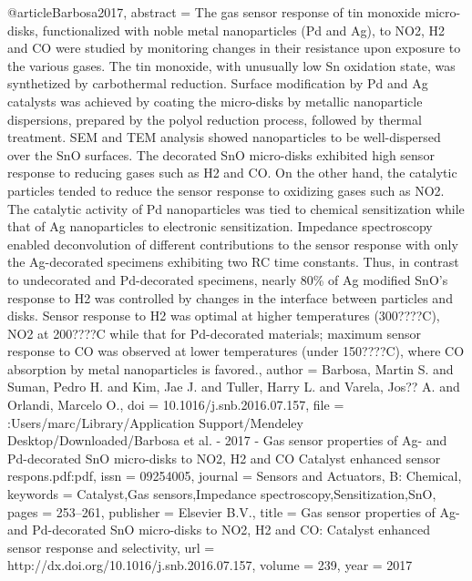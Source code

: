 @article{Barbosa2017,
abstract = {The gas sensor response of tin monoxide micro-disks, functionalized with noble metal nanoparticles (Pd and Ag), to NO2, H2 and CO were studied by monitoring changes in their resistance upon exposure to the various gases. The tin monoxide, with unusually low Sn oxidation state, was synthetized by carbothermal reduction. Surface modification by Pd and Ag catalysts was achieved by coating the micro-disks by metallic nanoparticle dispersions, prepared by the polyol reduction process, followed by thermal treatment. SEM and TEM analysis showed nanoparticles to be well-dispersed over the SnO surfaces. The decorated SnO micro-disks exhibited high sensor response to reducing gases such as H2 and CO. On the other hand, the catalytic particles tended to reduce the sensor response to oxidizing gases such as NO2. The catalytic activity of Pd nanoparticles was tied to chemical sensitization while that of Ag nanoparticles to electronic sensitization. Impedance spectroscopy enabled deconvolution of different contributions to the sensor response with only the Ag-decorated specimens exhibiting two RC time constants. Thus, in contrast to undecorated and Pd-decorated specimens, nearly 80{\%} of Ag modified SnO's response to H2 was controlled by changes in the interface between particles and disks. Sensor response to H2 was optimal at higher temperatures (300????C), NO2 at 200????C while that for Pd-decorated materials; maximum sensor response to CO was observed at lower temperatures (under 150????C), where CO absorption by metal nanoparticles is favored.},
author = {Barbosa, Martin S. and Suman, Pedro H. and Kim, Jae J. and Tuller, Harry L. and Varela, Jos?? A. and Orlandi, Marcelo O.},
doi = {10.1016/j.snb.2016.07.157},
file = {:Users/marc/Library/Application Support/Mendeley Desktop/Downloaded/Barbosa et al. - 2017 - Gas sensor properties of Ag- and Pd-decorated SnO micro-disks to NO2, H2 and CO Catalyst enhanced sensor respons.pdf:pdf},
issn = {09254005},
journal = {Sensors and Actuators, B: Chemical},
keywords = {Catalyst,Gas sensors,Impedance spectroscopy,Sensitization,SnO},
pages = {253--261},
publisher = {Elsevier B.V.},
title = {{Gas sensor properties of Ag- and Pd-decorated SnO micro-disks to NO2, H2 and CO: Catalyst enhanced sensor response and selectivity}},
url = {http://dx.doi.org/10.1016/j.snb.2016.07.157},
volume = {239},
year = {2017}
}
